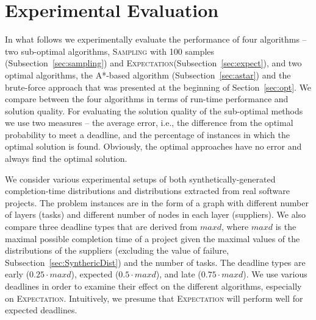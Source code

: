 \documentclass[letterpaper]{article} %
\newcommand{\astar}{\textsc{A*}\xspace}
\newcommand{\sampling}{\textsc{Sampling}\xspace}
\newcommand{\expectation}{\textsc{Expectation}\xspace}
\begin{document}
\section{Experimental Evaluation}
\label{sec:exp}

In what follows we experimentally evaluate the performance of four algorithms -- two sub-optimal algorithms, \sampling with 100 samples (Subsection~\ref{sec:sampling}) and \expectation (Subsection~\ref{sec:expect}), and two optimal algorithms, the \astar-based algorithm (Subsection~\ref{sec:astar}) and the brute-force approach that was presented at the beginning of Section~\ref{sec:opt}.
We compare between the four algorithms in terms of run-time performance and solution quality. For evaluating the solution quality of the sub-optimal methods we use two measures -- the average error, i.e., the difference from the optimal probability to meet a deadline, and the percentage of instances in which the optimal solution is found. Obviously, the optimal approaches have no error and always find the optimal solution.

We consider various experimental setups of both synthetically-generated completion-time distributions and distributions extracted from real software projects. The problem instances are in the form of a graph with different number of layers (tasks) and different number of nodes in each layer (suppliers). We also compare three deadline types that are derived from $maxd$, where $maxd$ is the maximal possible completion time of a project given the maximal values of the distributions of the suppliers (excluding the value of failure, Subsection~\ref{sec:SynthericDist}) and the number of tasks. The deadline types are early ($0.25\cdot maxd$), expected ($0.5\cdot maxd$), and late ($0.75\cdot maxd$). We use various deadlines in order to examine their effect on the different algorithms, especially on \expectation. Intuitively, we presume that \expectation will perform well for expected deadlines.
\end{document}
